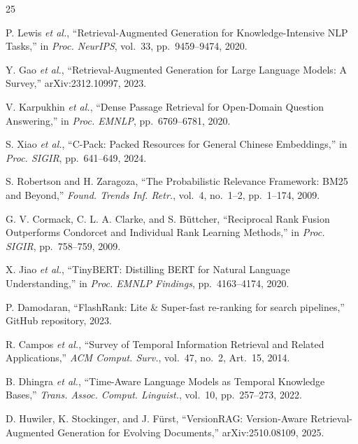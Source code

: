 \documentclass[journal]{IEEEtran}
\begin{document}
\begin{thebibliography}{25}
\scriptsize
\setlength{\itemsep}{-1.8pt plus 0.2pt}
\setlength{\parskip}{0pt}
\setlength{\parsep}{0pt}

P. Lewis \emph{et al.}, ``Retrieval-Augmented Generation for Knowledge-Intensive NLP Tasks,'' in \emph{Proc. NeurIPS}, vol.~33, pp.~9459--9474, 2020.

Y. Gao \emph{et al.}, ``Retrieval-Augmented Generation for Large Language Models: A Survey,'' arXiv:2312.10997, 2023.

V. Karpukhin \emph{et al.}, ``Dense Passage Retrieval for Open-Domain Question Answering,'' in \emph{Proc. EMNLP}, pp.~6769--6781, 2020.

S. Xiao \emph{et al.}, ``C-Pack: Packed Resources for General Chinese Embeddings,'' in \emph{Proc. SIGIR}, pp.~641--649, 2024.

S. Robertson and H. Zaragoza, ``The Probabilistic Relevance Framework: BM25 and Beyond,'' \emph{Found. Trends Inf. Retr.}, vol.~4, no.~1--2, pp.~1--174, 2009.

G. V. Cormack, C. L. A. Clarke, and S. B\"{u}ttcher, ``Reciprocal Rank Fusion Outperforms Condorcet and Individual Rank Learning Methods,'' in \emph{Proc. SIGIR}, pp.~758--759, 2009.

X. Jiao \emph{et al.}, ``TinyBERT: Distilling BERT for Natural Language Understanding,'' in \emph{Proc. EMNLP Findings}, pp.~4163--4174, 2020.

P. Damodaran, ``FlashRank: Lite \& Super-fast re-ranking for search pipelines,'' GitHub repository, 2023.

R. Campos \emph{et al.}, ``Survey of Temporal Information Retrieval and Related Applications,'' \emph{ACM Comput. Surv.}, vol.~47, no.~2, Art.~15, 2014.

B. Dhingra \emph{et al.}, ``Time-Aware Language Models as Temporal Knowledge Bases,'' \emph{Trans. Assoc. Comput. Linguist.}, vol.~10, pp.~257--273, 2022.

D. Huwiler, K. Stockinger, and J. F\"{u}rst, ``VersionRAG: Version-Aware Retrieval-Augmented Generation for Evolving Documents,'' arXiv:2510.08109, 2025.


\end{thebibliography}
\end{document}
